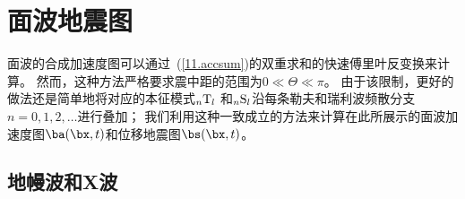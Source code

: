 \section{面波地震图}
%
%
\label{11.sec.wiggly}

面波的合成加速度图可以通过~(\ref{11.accsum})的双重求和的快速傅里叶反变换来计算。
然而，这种方法严格要求震中距的范围为$0\ll\Theta\ll\pi$。
由于该限制，更好的做法还是简单地将对应的本征模式${}_n{\rm T}_l$
和${}_n{\rm S}_l$沿每条勒夫和瑞利波频散分支$n=0,1,2,\ldots$进行叠加；
我们利用这种一致成立的方法来计算在此所展示的面波加速度图$\ba(\bx,t)$和位移地震图$\bs(\bx,t)$。

\subsection{地幔波和X波}
%
%

